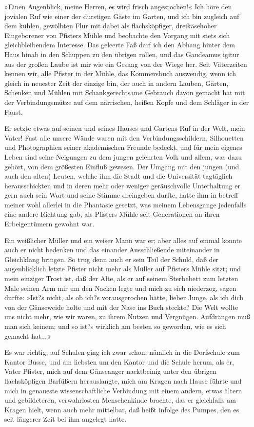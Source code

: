 »Einen Augenblick, meine Herren, es wird frisch angestochen!« Ich
höre den jovialen Ruf wie einer der durstigen Gäste im Garten, und
ich bin zugleich auf dem kühlen, gewölbten Flur mit dabei als
flachsköpfiger, dreikäsehoher Eingeborener von Pfisters Mühle und
beobachte den Vorgang mit stets sich gleichbleibendem Interesse.
Das geleerte Faß darf ich den Abhang hinter dem Haus hinab in den
Schuppen zu den übrigen rollen, und das Gaudeamus igitur aus der
großen Laube ist mir wie ein Gesang von der Wiege her. Seit
Väterzeiten kennen wir, alle Pfister in der Mühle, das Kommersbuch
auswendig, wenn ich gleich in neuester Zeit der einzige bin, der
auch in andern Lauben, Gärten, Schenken und Mühlen mit
Schankgerechtsame Gebrauch davon gemacht hat mit der
Verbindungsmütze auf dem närrischen, heißen Kopfe und dem Schläger
in der Faust.

Er setzte etwas auf seinen und seines Hauses und Gartens Ruf in der
Welt, mein Vater! Fast alle unsere Wände waren mit den
Verbindungsschildern, Silhouetten und Photographien seiner
akademischen Freunde bedeckt, und für mein eigenes Leben sind seine
Neigungen zu dem jungen gelehrten Volk und allem, was dazu gehört,
von dem größesten Einfluß gewesen. Der Umgang mit den jungen (und
auch den alten) Leuten, welche ihm die Stadt und die Universität
tagtäglich herausschickten und in deren mehr oder weniger
geräuschvolle Unterhaltung er gern auch sein Wort und seine Stimme
dreingeben durfte, hatte ihm in betreff meiner wohl allerlei in die
Phantasie gesetzt, was meinem Lebensgange jedenfalls eine andere
Richtung gab, als Pfisters Mühle seit Generationen an ihren
Erbeigentümern gewohnt war.

Ein weißlicher Müller und ein weiser Mann war er; aber alles auf
einmal konnte auch er nicht bedenken und das einander
Ausschließende miteinander in Gleichklang bringen. So trug denn
auch er sein Teil der Schuld, daß der augenblicklich letzte Pfister
nicht mehr als Müller auf Pfisters Mühle sitzt; und mein einziger
Trost ist, daß der Alte, als er auf seinem Sterbebett zum letzten
Male seinen Arm mir um den Nacken legte und mich zu sich niederzog,
sagen durfte: »Ist?s nicht, als ob ich?s vorausgerochen hätte,
lieber Junge, als ich dich von der Gänseweide holte und mit der
Nase ins Buch steckte? Die Welt wollte uns nicht mehr, wie wir
waren, zu ihrem Nutzen und Vergnügen. Aufdrängen muß man sich
keinem; und so ist?s wirklich am besten so geworden, wie es sich
gemacht hat...«

Es war richtig; auf Schulen ging ich zwar schon, nämlich in die
Dorfschule zum Kantor Busse, und am liebsten um den Kantor und die
Schule herum, als er, Vater Pfister, mich auf dem Gänseanger
nacktbeinig unter den übrigen flachsköpfigen Barfüßern
herauslangte, mich am Kragen nach Hause führte und mich in
genaueste wissenschaftliche Verbindung mit einem andern, etwas
ältern und gebildeteren, verwahrlosten Menschenkinde brachte, das
er gleichfalls am Kragen hielt, wenn auch mehr mittelbar, daß heißt
infolge des Pumpes, den es seit längerer Zeit bei ihm angelegt
hatte.


